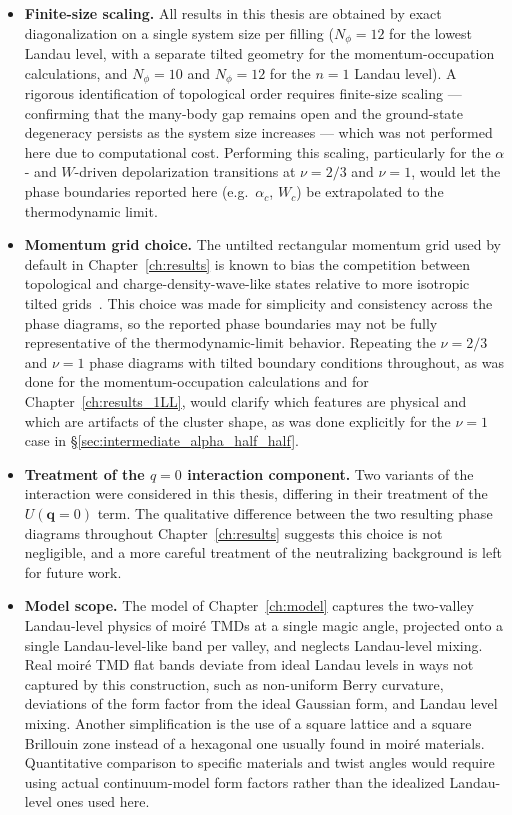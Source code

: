 \begin{itemize}
    \item \textbf{Finite-size scaling.} All results in this thesis are obtained by exact diagonalization on a single system size per filling ($N_\phi = 12$ for the lowest Landau level, with a separate tilted geometry for the momentum-occupation calculations, and $N_\phi = 10$ and $N_\phi = 12$ for the $n=1$ Landau level). A rigorous identification of topological order requires finite-size scaling --- confirming that the many-body gap remains open and the ground-state degeneracy persists as the system size increases --- which was not performed here due to computational cost. Performing this scaling, particularly for the $\alpha$- and $W$-driven depolarization transitions at $\nu = 2/3$ and $\nu = 1$, would let the phase boundaries reported here (e.g.\ $\alpha_c$, $W_c$) be extrapolated to the thermodynamic limit. %

    \item \textbf{Momentum grid choice.} The untilted rectangular momentum grid used by default in Chapter~\ref{ch:results} is known to bias the competition between topological and charge-density-wave-like states relative to more isotropic tilted grids~\cite{lauchli2013hierarchy}. This choice was made for simplicity and consistency across the phase diagrams, so the reported phase boundaries may not be fully representative of the thermodynamic-limit behavior. Repeating the $\nu = 2/3$ and $\nu = 1$ phase diagrams with tilted boundary conditions throughout, as was done for the momentum-occupation calculations and for Chapter~\ref{ch:results_1LL}, would clarify which features are physical and which are artifacts of the cluster shape, as was done explicitly for the $\nu = 1$ case in \S\ref{sec:intermediate_alpha_half_half}.

    \item \textbf{Treatment of the $q=0$ interaction component.} Two variants of the interaction were considered in this thesis, differing in their treatment of the $U(\mathbf{q}=0)$ term. The qualitative difference between the two resulting phase diagrams throughout Chapter~\ref{ch:results} suggests this choice is not negligible, and a more careful treatment of the neutralizing background is left for future work. %

    \item \textbf{Model scope.} The model of Chapter~\ref{ch:model} captures the two-valley Landau-level physics of moir\'e TMDs at a single magic angle, projected onto a single Landau-level-like band per valley, and neglects Landau-level mixing. Real moir\'e TMD flat bands deviate from ideal Landau levels in ways not captured by this construction, such as non-uniform Berry curvature, deviations of the form factor from the ideal Gaussian form, and Landau level mixing. Another simplification is the use of a square lattice and a square Brillouin zone instead of a hexagonal one usually found in moir\'e materials. Quantitative comparison to specific materials and twist angles would require using actual continuum-model form factors rather than the idealized Landau-level ones used here.


\end{itemize}
